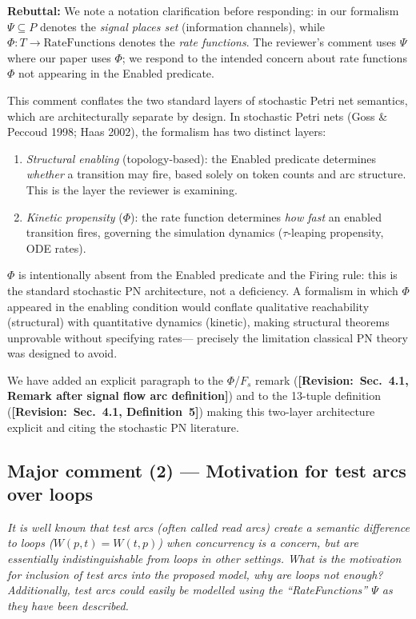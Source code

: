 \documentclass[11pt,letterpaper]{article}
\newcommand{\rquote}[1]{\begin{mdframed}[style=reviewquote]\textit{#1}\end{mdframed}}
\newcommand{\sref}[1]{\textbf{[Revision:~#1]}}
\newcommand{\rebuttal}[1]{\textcolor{green!40!black}{\textbf{Rebuttal:} #1}}
\begin{document}
\rebuttal{We note a notation clarification before responding: in our formalism
$\Psi \subseteq P$ denotes the \emph{signal places set} (information channels),
while $\Phi: T \rightarrow \text{RateFunctions}$ denotes the \emph{rate
functions}. The reviewer's comment uses $\Psi$ where our paper uses $\Phi$;
we respond to the intended concern about rate functions $\Phi$ not appearing
in the Enabled predicate.

This comment conflates the two standard layers of stochastic Petri
net semantics, which are architecturally separate by design.
In stochastic Petri nets (Goss \& Peccoud 1998; Haas 2002), the formalism
has two distinct layers:
\begin{enumerate}
  \item \emph{Structural enabling} (topology-based): the Enabled predicate
    determines \emph{whether} a transition may fire, based solely on token
    counts and arc structure. This is the layer the reviewer is examining.
  \item \emph{Kinetic propensity} ($\Phi$): the rate function determines
    \emph{how fast} an enabled transition fires, governing the simulation
    dynamics ($\tau$-leaping propensity, ODE rates).
\end{enumerate}
$\Phi$ is intentionally absent from the Enabled predicate and the Firing
rule: this is the standard stochastic PN architecture, not a deficiency.
A formalism in which $\Phi$ appeared in the enabling condition would
conflate qualitative reachability (structural) with quantitative dynamics
(kinetic), making structural theorems unprovable without specifying rates---
precisely the limitation classical PN theory was designed to avoid.

We have added an explicit paragraph to the $\Phi$/$F_s$ remark
(\sref{Sec.~4.1, Remark after signal flow arc definition}) and to the
13-tuple definition (\sref{Sec.~4.1, Definition~5}) making this two-layer
architecture explicit and citing the stochastic PN literature.}

\subsection*{Major comment (2) --- Motivation for test arcs over loops}

\rquote{It is well known that test arcs (often called read arcs) create a
semantic difference to loops ($W(p,t)=W(t,p)$) when concurrency is a
concern, but are essentially indistinguishable from loops in other settings.
What is the motivation for inclusion of test arcs into the proposed model,
why are loops not enough? Additionally, test arcs could easily be modelled
using the ``RateFunctions'' $\Psi$ as they have been described.}
\end{document}
